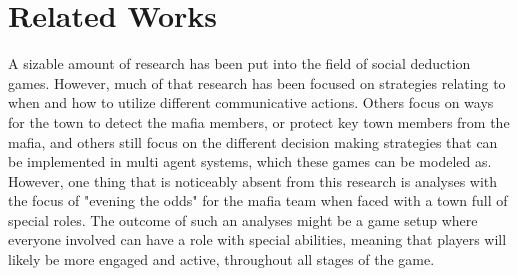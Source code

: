 \section{Related Works}
A sizable amount of research has been put into the field of social deduction 
games. However, much of that research has been focused on strategies relating 
to when and how to utilize different communicative actions\cite{commitment}. 
Others focus on ways for the town to detect the mafia 
members\cite{werewolfstealth}, or protect key town members from the 
mafia\cite{werewolfnashequilibrium}, and others still focus on the different 
decision making strategies that can be implemented in multi agent systems, 
which these games can be modeled 
as\cite{modellingmultiagentepistemicsystems}\cite{multiagentepistemicplannercommonknowledge}\cite{probibalisticmultiagentsystems}.
 However, one thing that is noticeably absent from this research is analyses 
with the focus of "evening the odds" for the mafia team when faced with a town 
full of special roles. The outcome of such an analyses might be a game setup 
where everyone involved can have a role with special abilities, meaning that 
players will likely be more engaged and active, throughout all stages of the 
game. 

